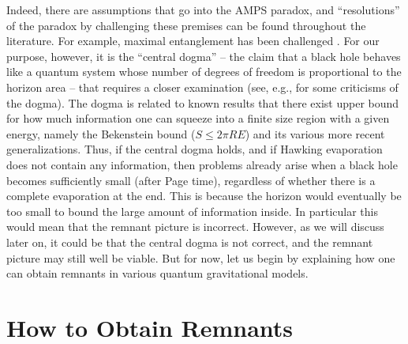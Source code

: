 \documentclass[12pt,preprintnumbers, floatfix, preprintnumbers, letterpaper, superscriptaddress,nofootinbib]{revtex4-2}
\begin{document}
Indeed, there are assumptions that go into the AMPS paradox, and ``resolutions'' of the paradox by challenging these premises can be found throughout the literature. For example, maximal entanglement has been challenged \cite{1908.01005,2409.05051}. For our purpose, however, it is the ``central dogma'' \cite{2006.06872} -- the claim that a black hole behaves like a quantum
system whose number of degrees of freedom is proportional to the horizon area -- that requires a closer examination (see, e.g., \cite{2107.05662} for some criticisms of the dogma). The dogma is related to known results that there exist upper bound for how much information one can squeeze into a finite size region with a given energy, namely the Bekenstein bound \cite{bek} ($S \leqslant 2\pi R E$) and its various more recent generalizations.   
Thus, if the central dogma holds, and if Hawking evaporation does not contain any information, then problems already arise when a black hole becomes sufficiently small (after Page time), regardless of whether there is a complete evaporation at the end. This is because the horizon would eventually be too small to bound the large amount of information inside. In particular this would mean that the remnant picture is incorrect. However, as we will discuss later on, it could be that the central dogma is not correct, and the remnant picture may still well be viable. But for now, let us begin by explaining how one can obtain remnants in various quantum gravitational models.

\section{How to Obtain Remnants}
\end{document}
